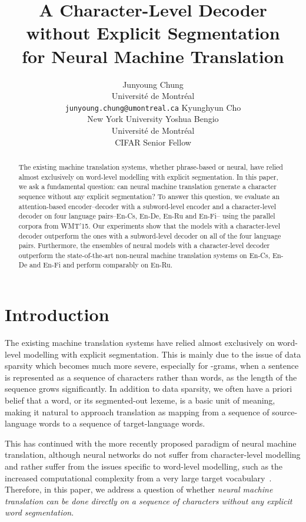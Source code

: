\documentclass[11pt]{article}
\title{A Character-Level Decoder without Explicit Segmentation\\ 
       for Neural Machine Translation}
\author{Junyoung Chung \\
Universit\'e de Montr\'eal \\
        {\small \texttt{junyoung.chung@umontreal.ca}}
	  \And
	Kyunghyun Cho \\
    New York University 
	  \And
	Yoshua Bengio \\
Universit\'e de Montr\'eal \\
    CIFAR Senior Fellow
  }
\date{}
\begin{document}
\maketitle
\vspace*{-7mm}
\begin{abstract}
    The existing machine translation systems, whether phrase-based or neural,
    have relied almost exclusively on word-level modelling with explicit
    segmentation. In this paper, we ask a fundamental question: can neural
    machine translation generate a character sequence without any explicit
    segmentation? To answer this question, we evaluate an
    attention-based encoder--decoder with a subword-level encoder and a
    character-level decoder on four language pairs--En-Cs, En-De, En-Ru and
    En-Fi-- using the parallel corpora from WMT'15. Our experiments show that
    the models with a character-level decoder outperform the ones with a
    subword-level decoder on all of the four language pairs.
    Furthermore, the ensembles of neural models with a character-level
    decoder outperform the state-of-the-art non-neural machine translation
    systems on En-Cs, En-De and En-Fi and perform comparably on En-Ru.
\end{abstract}

\vspace*{-3mm}
\section{Introduction}
\label{sec:intro}
\vspace*{-2mm}

The existing machine translation systems have relied almost exclusively on
word-level modelling with explicit segmentation. This is mainly due to the issue
of data sparsity which becomes much more severe, especially for -grams, when a sentence is represented
as a sequence of characters rather than words, as the length of the sequence
grows significantly. In addition to data sparsity, we often have a priori belief
that a word, or its segmented-out lexeme, is a basic unit of meaning, making it
natural to approach translation as mapping from a sequence of source-language words to a
sequence of target-language words.

This has continued with the more recently proposed paradigm of neural machine
translation, although neural networks do not suffer from character-level
modelling and rather suffer from the issues specific to word-level modelling,
such as the increased computational complexity from a very large target
vocabulary~\cite{jean2014using,luong2014addressing}.
Therefore, in this paper,
we address a question of whether {\em neural machine translation can be done
directly on a sequence of characters without any explicit word
segmentation}. 
\end{document}
